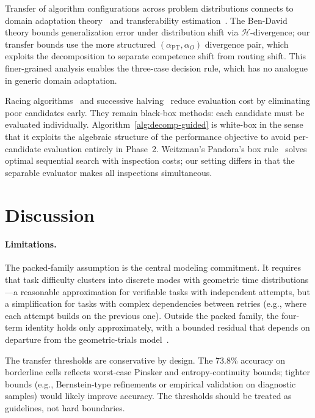 Transfer of algorithm configurations across problem
distributions connects to domain adaptation
theory~\citep{bendavid2010theory,mansour2009domain} and
transferability estimation~\citep{achille2019task2vec,you2021logme,
pandy2022transferability}.  The Ben-David theory bounds generalization
error under distribution shift via $\mathcal{H}$-divergence; our transfer bounds
use the more structured $(\alpha_{\mathrm{PT}}, \alpha_O)$ divergence
pair, which exploits the decomposition to separate competence shift from
routing shift.  This finer-grained analysis enables the three-case
decision rule, which has no analogue in generic domain adaptation.

Racing algorithms~\citep{maron1993hoeffding,maron1997racing} and
successive halving~\citep{jamieson2016successive} reduce evaluation cost
by eliminating poor candidates early.  They remain black-box methods:
each candidate must be evaluated individually.
Algorithm~\ref{alg:decomp-guided} is white-box in the sense that it
exploits the algebraic structure of the performance objective to avoid
per-candidate evaluation entirely in Phase~2.
Weitzman's Pandora's box rule~\citep{weitzman1979optimal} solves optimal
sequential search with inspection costs; our setting differs in that the
separable evaluator makes all inspections simultaneous.

\section{Discussion}
\label{sec:discussion}

\paragraph{Limitations.}
The packed-family assumption is the central modeling commitment.
It requires that task difficulty clusters into discrete modes with
geometric time distributions---a reasonable approximation for
verifiable tasks with independent attempts, but a simplification for
tasks with complex dependencies between retries (e.g., where each
attempt builds on the previous one).  Outside the packed family, the
four-term identity holds only approximately, with a bounded residual
that depends on departure from the geometric-trials
model~\citep{beneventano2026framework}.

The transfer thresholds are conservative by design.  The 73.8\% accuracy
on borderline cells reflects worst-case Pinsker and entropy-continuity
bounds; tighter bounds (e.g., Bernstein-type refinements or empirical
validation on diagnostic samples) would likely improve accuracy.  The
thresholds should be treated as guidelines, not hard boundaries.


